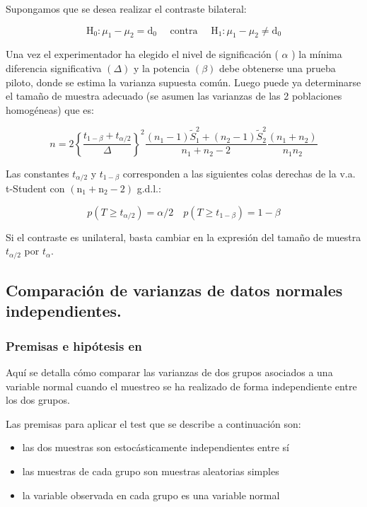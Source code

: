 \documentclass[
]{article}
\providecommand{\tightlist}{%
  \setlength{\itemsep}{0pt}\setlength{\parskip}{0pt}}
\begin{document}
Supongamos que se desea realizar el contraste bilateral:

\[
\mathrm{H}_{0}: \mu_{1}-\mu_{2}=\mathrm{d}_{0} \quad \text { contra } \quad \mathrm{H}_{1}: \mu_{1}-\mu_{2} \neq \mathrm{d}_{0}
\]

Una vez el experimentador ha elegido el nivel de significación ( \(\alpha\) ) la mínima diferencia significativa \((\Delta)\) y la potencia \((\beta)\) debe obtenerse una prueba piloto, donde se estima la varianza supuesta común. Luego puede ya determinarse el tamaño de muestra adecuado (se asumen las varianzas de las 2 poblaciones homogéneas) que es:

\[
n=2\left\{\frac{t_{1-\beta}+t_{\alpha / 2}}{\Delta}\right\}^{2} \frac{\left(n_{1}-1\right) \widetilde{S}_{1}^{2}+\left(n_{2}-1\right) \widetilde{S}_{2}^{2}}{n_{1}+n_{2}-2} \frac{\left(n_{1}+n_{2}\right)}{n_{1} n_{2}}
\]

Las constantes \(t_{\alpha / 2}\) y \(t_{1-\beta}\) corresponden a las siguientes colas derechas de la v.a. t-Student con \(\left(\mathrm{n}_{1}+\mathrm{n}_{2}-2\right)\) g.d.l.:

\[
p\left(T \geq t_{\alpha / 2}\right)=\alpha / 2 \quad p\left(T \geq t_{1-\beta}\right)=1-\beta
\]

Si el contraste es unilateral, basta cambiar en la expresión del tamaño de muestra \(t_{\alpha / 2}\) por \(t_{\alpha}\).

\subsection{Comparación de varianzas de datos normales independientes.}\label{comparaciuxf3n-de-varianzas-de-datos-normales-independientes.}

\subsubsection{Premisas e hipótesis en}\label{premisas-e-hipuxf3tesis-en}

Aquí se detalla cómo comparar las varianzas de dos grupos asociados a una variable normal cuando el muestreo se ha realizado de forma independiente entre los dos grupos.

Las premisas para aplicar el test que se describe a continuación son:

\begin{itemize}
\tightlist
\item
  las dos muestras son estocásticamente independientes entre sí
\item
  las muestras de cada grupo son muestras aleatorias simples
\item
  la variable observada en cada grupo es una variable normal
\end{itemize}
\end{document}
